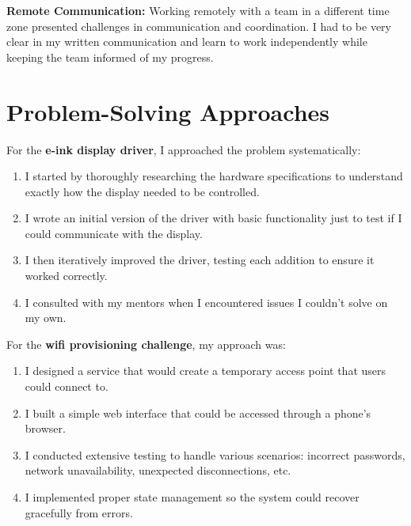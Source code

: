 \documentclass[12pt,a4paper]{report}
\begin{document}
\vspace{0.3cm}

\textbf{Remote Communication:} Working remotely with a team in a different time zone presented challenges in communication and coordination. I had to be very clear in my written communication and learn to work independently while keeping the team informed of my progress.

\section{Problem-Solving Approaches}

For the \textbf{e-ink display driver}, I approached the problem systematically:

\begin{enumerate}[itemsep=0.2cm]
    \item I started by thoroughly researching the hardware specifications to understand exactly how the display needed to be controlled.
    \item I wrote an initial version of the driver with basic functionality just to test if I could communicate with the display.
    \item I then iteratively improved the driver, testing each addition to ensure it worked correctly.
    \item I consulted with my mentors when I encountered issues I couldn't solve on my own.
\end{enumerate}

\vspace{0.3cm}

For the \textbf{wifi provisioning challenge}, my approach was:

\begin{enumerate}[itemsep=0.2cm]
    \item I designed a service that would create a temporary access point that users could connect to.
    \item I built a simple web interface that could be accessed through a phone's browser.
    \item I conducted extensive testing to handle various scenarios: incorrect passwords, network unavailability, unexpected disconnections, etc.
    \item I implemented proper state management so the system could recover gracefully from errors.
\end{enumerate}

\vspace{0.3cm}
\end{document}
